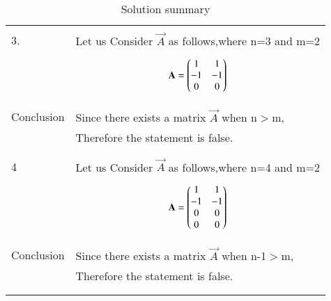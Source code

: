 \begin{longtable}{|l|l|}
&\\
\hline
&\\
3.&Let us Consider $\vec{A}$ as follows,where n=3 and m=2\\
&\parbox{6cm}{\begin{align}
    \mathbf{A}=\begin{pmatrix}1&1\\-1&-1\\0&0\end{pmatrix}
\end{align}}\\
\hline
&\\
Conclusion&Since there exists a matrix $\vec{A}$ when n$>$m,\\
&Therefore the statement is false.\\
&\\
\hline
&\\
4&Let us Consider $\vec{A}$ as follows,where n=4 and m=2\\
&\parbox{6cm}{\begin{align}
    \mathbf{A}=\begin{pmatrix}1&1\\-1&-1\\0&0\\0&0\end{pmatrix}
\end{align}}\\
\hline
&\\
Conclusion&Since there exists a matrix $\vec{A}$ when n-1$>$m,\\
&Therefore the statement is false.\\
&\\
\hline
\caption{Solution summary}
\label{eq:solutions/2016/dec/32/table:2}
\end{longtable}
\twocolumn
